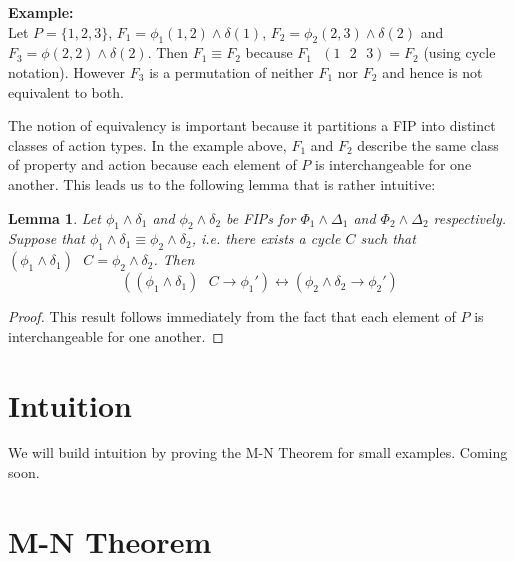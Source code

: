 \documentclass[12pt]{article}
\newtheorem{lemma}{Lemma}
\newcommand{\msp}{\text{ }}
\begin{document}
\noindent \textbf{Example:}\\
Let $P=\{1,2,3\}$, $F_1 = \phi_1(1,2) \land \delta(1)$, $F_2 = \phi_2(2,3) \land \delta(2)$ and $F_3 = \phi(2,2) \land \delta(2)$.  Then $F_1 \equiv F_2$ because $F_1 \msp (1 \msp 2 \msp 3) = F_2$ (using cycle notation).  However $F_3$ is a permutation of neither $F_1$ nor $F_2$ and hence is not equivalent to both.

The notion of equivalency is important because it partitions a FIP into distinct classes of action types.  In the example above, $F_1$ and $F_2$ describe the same class of property and action because each element of $P$ is interchangeable for one another.  This leads us to the following lemma that is rather intuitive:

\begin{lemma}
  Let $\phi_1\land\delta_1$ and $\phi_2\land\delta_2$ be FIPs for $\Phi_1\land\Delta_1$ and $\Phi_2\land\Delta_2$ respectively.  Suppose that $\phi_1\land\delta_1 \equiv \phi_2\land\delta_2$, i.e. there exists a cycle $C$ such that $(\phi_1\land\delta_1) \msp C = \phi_2\land\delta_2$.  Then
  $$((\phi_1 \land \delta_1) \msp C \rightarrow \phi_1') \leftrightarrow (\phi_2 \land \delta_2 \rightarrow \phi_2')$$
\end{lemma}
\begin{proof}
  This result follows immediately from the fact that each element of $P$ is interchangeable for one another.
\end{proof}


\section{Intuition}
We will build intuition by proving the M-N Theorem for small examples.  Coming soon.


\section{M-N Theorem}
\end{document}
